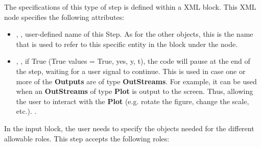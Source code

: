 The specifications of this type of step is defined within a
 XML block.
%
This XML node specifies the following attributes:
\vspace{-5mm}
\begin{itemize}
\itemsep0em
\item {}, , user-defined name of
  this Step.
  \nb As for the other objects, this is the name that is used to refer to
  this specific entity in the  block under the
   node.
\item {}, , if True
  (True values = True, yes, y, t), the code will pause at the end of
  the step, waiting for a user signal to continue. This is used in case one or
  more of the \textbf{Outputs} are of type \textbf{OutStreams}.
  For example, it can be used when an \textbf{OutStreams} of type
  \textbf{Plot} is output to the screen. Thus, allowing the user to interact
  with the \textbf{Plot} (e.g. rotate the figure, change the scale, etc.).
  .
\end{itemize}
\vspace{-5mm}
In the  input block, the user needs to specify the objects
needed for the different allowable roles.
%
This step accepts the following roles:
